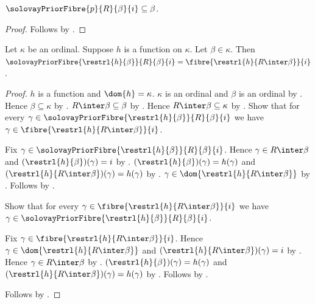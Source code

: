 \begin{proposition}\label{solovay_prior_fibre_subset}
    $\solovayPriorFibre{p}{R}{\beta}{i}\subseteq\beta$.
\end{proposition}
\begin{proof}
    Follows by .
\end{proof}

\begin{proposition}\label{solovay_prior_fibre_history}
    Let $\kappa$ be an ordinal.
    Suppose $h$ is a function on $\kappa$.
    Let $\beta\in\kappa$.
    Then $\solovayPriorFibre{\restrl{h}{\beta}}{R}{\beta}{i}
        =\fibre{\restrl{h}{R\inter\beta}}{i}$.
\end{proposition}
\begin{proof}
    $h$ is a function and $\dom{h}=\kappa$.
    $\kappa$ is an ordinal and $\beta$ is an ordinal
        by .
    Hence $\beta\subseteq\kappa$ by .
    $R\inter\beta\subseteq\beta$ by .
    Hence $R\inter\beta\subseteq\kappa$ by .
    Show that for every $\gamma\in
        \solovayPriorFibre{\restrl{h}{\beta}}{R}{\beta}{i}$
        we have $\gamma\in\fibre{\restrl{h}{R\inter\beta}}{i}$.
    \begin{subproof}
        Fix $\gamma\in
            \solovayPriorFibre{\restrl{h}{\beta}}{R}{\beta}{i}$.
        Hence $\gamma\in R\inter\beta$ and
            $(\restrl{h}{\beta})(\gamma)=i$
            by .
        $(\restrl{h}{\beta})(\gamma)=h(\gamma)$ and
            $(\restrl{h}{R\inter\beta})(\gamma)=h(\gamma)$
            by .
        $\gamma\in\dom{\restrl{h}{R\inter\beta}}$
            by .
        Follows by .
    \end{subproof}
    Show that for every $\gamma\in
        \fibre{\restrl{h}{R\inter\beta}}{i}$ we have
        $\gamma\in\solovayPriorFibre{\restrl{h}{\beta}}{R}{\beta}{i}$.
    \begin{subproof}
        Fix $\gamma\in\fibre{\restrl{h}{R\inter\beta}}{i}$.
        Hence $\gamma\in\dom{\restrl{h}{R\inter\beta}}$ and
            $(\restrl{h}{R\inter\beta})(\gamma)=i$
            by .
        Hence $\gamma\in R\inter\beta$
            by .
        $(\restrl{h}{\beta})(\gamma)=h(\gamma)$ and
            $(\restrl{h}{R\inter\beta})(\gamma)=h(\gamma)$
            by .
        Follows by .
    \end{subproof}
    Follows by .
\end{proof}

